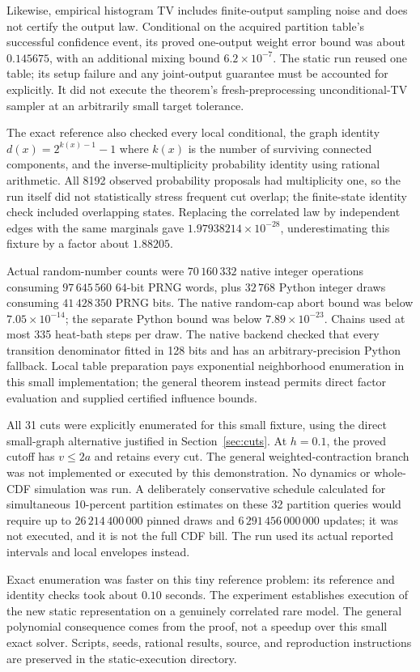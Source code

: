 Likewise, empirical histogram TV includes finite-output sampling noise and does not certify the output law. Conditional on the acquired partition table's successful confidence event, its proved one-output weight error bound was about $0.145675$, with an additional mixing bound $6.2\times10^{-7}$. The static run reused one table; its setup failure and any joint-output guarantee must be accounted for explicitly. It did not execute the theorem's fresh-preprocessing unconditional-TV sampler at an arbitrarily small target tolerance.

The exact reference also checked every local conditional, the graph identity $d(x)=2^{k(x)-1}-1$ where $k(x)$ is the number of surviving connected components, and the inverse-multiplicity probability identity using rational arithmetic. All 8192 observed probability proposals had multiplicity one, so the run itself did not statistically stress frequent cut overlap; the finite-state identity check included overlapping states. Replacing the correlated law by independent edges with the same marginals gave $1.97938214\times10^{-28}$, underestimating this fixture by a factor about $1.88205$.

Actual random-number counts were $70\,160\,332$ native integer operations consuming $97\,645\,560$ 64-bit PRNG words, plus $32\,768$ Python integer draws consuming $41\,428\,350$ PRNG bits. The native random-cap abort bound was below $7.05\times10^{-14}$; the separate Python bound was below $7.89\times10^{-23}$. Chains used at most 335 heat-bath steps per draw. The native backend checked that every transition denominator fitted in 128 bits and has an arbitrary-precision Python fallback. Local table preparation pays exponential neighborhood enumeration in this small implementation; the general theorem instead permits direct factor evaluation and supplied certified influence bounds.

All 31 cuts were explicitly enumerated for this small fixture, using the direct small-graph alternative justified in Section~\ref{sec:cuts}. At $h=0.1$, the proved cutoff has $v\le2a$ and retains every cut. The general weighted-contraction branch was not implemented or executed by this demonstration. No dynamics or whole-CDF simulation was run. A deliberately conservative schedule calculated for simultaneous 10-percent partition estimates on these 32 partition queries would require up to $26\,214\,400\,000$ pinned draws and $6\,291\,456\,000\,000$ updates; it was not executed, and it is not the full CDF bill. The run used its actual reported intervals and local envelopes instead.

Exact enumeration was faster on this tiny reference problem: its reference and identity checks took about $0.10$ seconds. The experiment establishes execution of the new static representation on a genuinely correlated rare model. The general polynomial consequence comes from the proof, not a speedup over this small exact solver. Scripts, seeds, rational results, source, and reproduction instructions are preserved in the static-execution directory.
